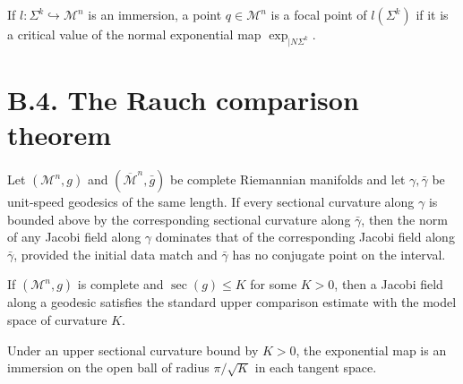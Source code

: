 \begin{definition}
\label{appb-def-focal-point}


If $l:\Sigma^k\hookrightarrow\mathcal M^n$ is an immersion, a point $q\in\mathcal M^n$ is a focal point of $l(\Sigma^k)$ if it is a critical value of the normal exponential map $\exp_{\mid N\Sigma^k}$.
\end{definition}

\section*{B.4. The Rauch comparison theorem}

\begin{theorem}
\label{appb-thm-rauch-comparison}


Let $(\mathcal M^n,g)$ and $(\overline{\mathcal M}^n,\bar g)$ be complete Riemannian manifolds and let $\gamma,\bar\gamma$ be unit-speed geodesics of the same length. If every sectional curvature along $\gamma$ is bounded above by the corresponding sectional curvature along $\bar\gamma$, then the norm of any Jacobi field along $\gamma$ dominates that of the corresponding Jacobi field along $\bar\gamma$, provided the initial data match and $\bar\gamma$ has no conjugate point on the interval.
\end{theorem}

\begin{corollary}
\label{appb-cor-rauch-nonpositive-model}


If $(\mathcal M^n,g)$ is complete and $\sec(g)\le K$ for some $K>0$, then a Jacobi field along a geodesic satisfies the standard upper comparison estimate with the model space of curvature $K$.
\end{corollary}

\begin{corollary}
\label{appb-cor-rauch-injectivity-radius}


Under an upper sectional curvature bound by $K>0$, the exponential map is an immersion on the open ball of radius $\pi/\sqrt K$ in each tangent space.
\end{corollary}

